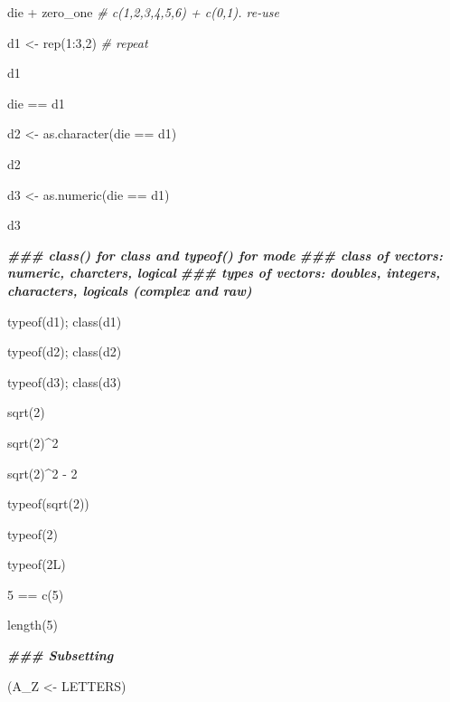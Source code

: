 \documentclass[
]{bxjsbook}
\newenvironment{Shaded}{\begin{snugshade}}{\end{snugshade}}
\newcommand{\CommentTok}[1]{\textcolor[rgb]{0.56,0.35,0.01}{\textit{#1}}}
\newcommand{\DecValTok}[1]{\textcolor[rgb]{0.00,0.00,0.81}{#1}}
\newcommand{\DocumentationTok}[1]{\textcolor[rgb]{0.56,0.35,0.01}{\textbf{\textit{#1}}}}
\newcommand{\FunctionTok}[1]{\textcolor[rgb]{0.00,0.00,0.00}{#1}}
\newcommand{\NormalTok}[1]{#1}
\newcommand{\OtherTok}[1]{\textcolor[rgb]{0.56,0.35,0.01}{#1}}
\newcommand{\SpecialCharTok}[1]{\textcolor[rgb]{0.00,0.00,0.00}{#1}}
\theoremstyle{definition}
\theoremstyle{definition}
\theoremstyle{definition}
\theoremstyle{definition}
\theoremstyle{remark}
\begin{document}
\begin{Shaded}
\begin{Highlighting}[]
\NormalTok{die }\SpecialCharTok{+}\NormalTok{ zero\_one }\CommentTok{\# c(1,2,3,4,5,6) + c(0,1). re{-}use}

\NormalTok{d1 }\OtherTok{\textless{}{-}} \FunctionTok{rep}\NormalTok{(}\DecValTok{1}\SpecialCharTok{:}\DecValTok{3}\NormalTok{,}\DecValTok{2}\NormalTok{) }\CommentTok{\# repeat}


\NormalTok{d1}

\NormalTok{die }\SpecialCharTok{==}\NormalTok{ d1}

\NormalTok{d2 }\OtherTok{\textless{}{-}} \FunctionTok{as.character}\NormalTok{(die }\SpecialCharTok{==}\NormalTok{ d1)}

\NormalTok{d2}

\NormalTok{d3 }\OtherTok{\textless{}{-}} \FunctionTok{as.numeric}\NormalTok{(die }\SpecialCharTok{==}\NormalTok{ d1)}

\NormalTok{d3}

\DocumentationTok{\#\#\# class() for class and typeof() for mode}
\DocumentationTok{\#\#\# class of vectors: numeric, charcters, logical}
\DocumentationTok{\#\#\# types of vectors: doubles, integers, characters, logicals (complex and raw)}

\FunctionTok{typeof}\NormalTok{(d1); }\FunctionTok{class}\NormalTok{(d1)}

\FunctionTok{typeof}\NormalTok{(d2); }\FunctionTok{class}\NormalTok{(d2)}

\FunctionTok{typeof}\NormalTok{(d3); }\FunctionTok{class}\NormalTok{(d3)}

\FunctionTok{sqrt}\NormalTok{(}\DecValTok{2}\NormalTok{)}

\FunctionTok{sqrt}\NormalTok{(}\DecValTok{2}\NormalTok{)}\SpecialCharTok{\^{}}\DecValTok{2}

\FunctionTok{sqrt}\NormalTok{(}\DecValTok{2}\NormalTok{)}\SpecialCharTok{\^{}}\DecValTok{2} \SpecialCharTok{{-}} \DecValTok{2}

\FunctionTok{typeof}\NormalTok{(}\FunctionTok{sqrt}\NormalTok{(}\DecValTok{2}\NormalTok{))}

\FunctionTok{typeof}\NormalTok{(}\DecValTok{2}\NormalTok{)}

\FunctionTok{typeof}\NormalTok{(2L)}

\DecValTok{5} \SpecialCharTok{==} \FunctionTok{c}\NormalTok{(}\DecValTok{5}\NormalTok{)}

\FunctionTok{length}\NormalTok{(}\DecValTok{5}\NormalTok{)}

\DocumentationTok{\#\#\# Subsetting}

\NormalTok{(A\_Z }\OtherTok{\textless{}{-}}\NormalTok{ LETTERS)}


\end{Highlighting}
\end{Shaded}
\end{document}
